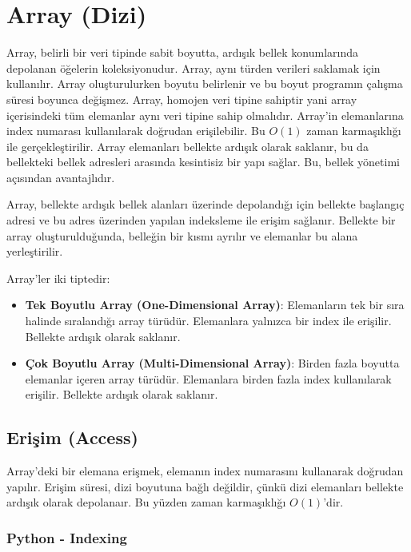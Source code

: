 \section{Array (Dizi)}

Array, belirli bir veri tipinde sabit boyutta, ardışık bellek konumlarında depolanan öğelerin koleksiyonudur. Array, aynı türden verileri saklamak için kullanılır. Array oluşturulurken boyutu belirlenir ve bu boyut programın çalışma süresi boyunca değişmez. Array, homojen veri tipine sahiptir yani array içerisindeki tüm elemanlar aynı veri tipine sahip olmalıdır. Array'in elemanlarına index numarası kullanılarak doğrudan erişilebilir. Bu $O(1)$ zaman karmaşıklığı ile gerçekleştirilir. Array elemanları bellekte ardışık olarak saklanır, bu da bellekteki bellek adresleri arasında kesintisiz bir yapı sağlar. Bu, bellek yönetimi açısından avantajlıdır.

Array, bellekte ardışık bellek alanları üzerinde depolandığı için bellekte başlangıç adresi ve bu adres üzerinden yapılan indeksleme ile erişim sağlanır. Bellekte bir array oluşturulduğunda, belleğin bir kısmı ayrılır ve elemanlar bu alana yerleştirilir.

Array'ler iki tiptedir:

\begin{itemize}
    \item \textbf{Tek Boyutlu Array (One-Dimensional Array)}: Elemanların tek bir sıra halinde sıralandığı array türüdür. Elemanlara yalnızca bir index ile erişilir. Bellekte ardışık olarak saklanır.
    \item \textbf{Çok Boyutlu Array (Multi-Dimensional Array)}: Birden fazla boyutta elemanlar içeren array türüdür. Elemanlara birden fazla index kullanılarak erişilir. Bellekte ardışık olarak saklanır.
\end{itemize}

\subsection{Erişim (Access)}

Array'deki bir elemana erişmek, elemanın index numarasını kullanarak doğrudan yapılır. Erişim süresi, dizi boyutuna bağlı değildir, çünkü dizi elemanları bellekte ardışık olarak depolanaır. Bu yüzden zaman karmaşıklığı $O(1)$'dir.

\subsubsection{Python - Indexing}

